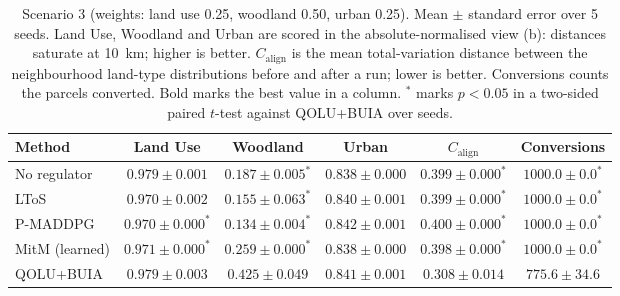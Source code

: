 \begin{table}[htbp]
  \centering
  \caption{Scenario 3 (weights: land use 0.25, woodland 0.50, urban 0.25). Mean $\pm$ standard error over 5 seeds. Land Use, Woodland and Urban are scored in the absolute-normalised view (b): distances saturate at 10~km; higher is better. $C_{\text{align}}$ is the mean total-variation distance between the neighbourhood land-type distributions before and after a run; lower is better. Conversions counts the parcels converted. Bold marks the best value in a column. $^{*}$ marks $p < 0.05$ in a two-sided paired $t$-test against QOLU+BUIA over seeds.}
  \label{tab:p2-results-s3}
  \begin{tabular}{lccccc}
    \toprule
    Method & Land Use & Woodland & Urban & $C_{\text{align}}$ & Conversions \\
    \midrule
    No regulator & $\mathbf{0.979 \pm 0.001}$ & $0.187 \pm 0.005^{*}$ & $0.838 \pm 0.000$ & $0.399 \pm 0.000^{*}$ & $1000.0 \pm 0.0^{*}$ \\
    LToS & $0.970 \pm 0.002$ & $0.155 \pm 0.063^{*}$ & $0.840 \pm 0.001$ & $0.399 \pm 0.000^{*}$ & $1000.0 \pm 0.0^{*}$ \\
    P-MADDPG & $0.970 \pm 0.000^{*}$ & $0.134 \pm 0.004^{*}$ & $\mathbf{0.842 \pm 0.001}$ & $0.400 \pm 0.000^{*}$ & $1000.0 \pm 0.0^{*}$ \\
    MitM (learned) & $0.971 \pm 0.000^{*}$ & $0.259 \pm 0.000^{*}$ & $0.838 \pm 0.000$ & $0.398 \pm 0.000^{*}$ & $1000.0 \pm 0.0^{*}$ \\
    QOLU+BUIA & $0.979 \pm 0.003$ & $\mathbf{0.425 \pm 0.049}$ & $0.841 \pm 0.001$ & $\mathbf{0.308 \pm 0.014}$ & $775.6 \pm 34.6$ \\
    \bottomrule
  \end{tabular}
\end{table}
